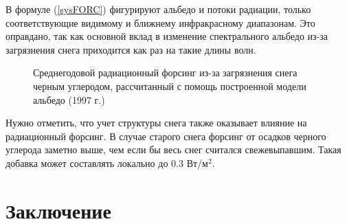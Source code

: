 \documentclass[a4paper, fontsize=14pt]{scrartcl}
\begin{document}
В формуле (\ref{sysFORC}) фигурируют альбедо и потоки радиации, только соответствующие видимому и ближнему инфракрасному диапазонам. Это оправдано, так как основной вклад в изменение спектрального альбедо из-за загрязнения снега приходится как раз на такие длины волн.

\begin{figure}[h]
    \caption{Среднегодовой радиационный форсинг из-за загрязнения снега черным углеродом, рассчитанный с помощь построенной модели альбедо (1997 г.)}
    \label{fig:image}
\end{figure}

Нужно отметить, что учет структуры снега также оказывает влияние на радиационный форсинг. В случае старого снега форсинг от осадков черного углерода заметно выше, чем если бы весь снег считался свежевыпавшим. Такая добавка может составлять локально до $0.3$ Вт/м$^2$. 



\newpage
\section*{Заключение}






\newpage
{}
{}


\end{document}
